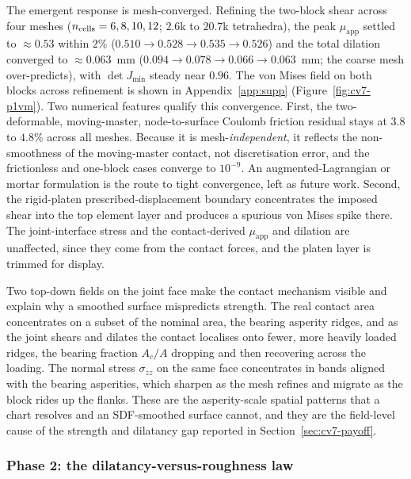 \documentclass{svjour3}                 %
\newcommand{\muapp}{\mu_{\mathrm{app}}}
\begin{document}
The emergent response is mesh-converged. Refining the two-block shear across four meshes ($n_{\rm cells}=6,8,10,12$; $2.6$k to $20.7$k tetrahedra), the peak $\muapp$ settled to $\approx0.53$ within $2\%$ ($0.510\to0.528\to0.535\to0.526$) and the total dilation converged to $\approx0.063$~mm ($0.094\to0.078\to0.066\to0.063$~mm; the coarse mesh over-predicts), with $\det J_{\min}$ steady near $0.96$. The von Mises field on both blocks across refinement is shown in Appendix~\ref{app:supp} (Figure~\ref{fig:cv7-p1vm}). Two numerical features qualify this convergence. First, the two-deformable, moving-master, node-to-surface Coulomb friction residual stays at $3.8$ to $4.8\%$ across all meshes. Because it is mesh-\emph{independent}, it reflects the non-smoothness of the moving-master contact, not discretisation error, and the frictionless and one-block cases converge to $10^{-9}$. An augmented-Lagrangian or mortar formulation \citep{alart1991mixed,simo1992augmented,puso2004mortar} is the route to tight convergence, left as future work. Second, the rigid-platen prescribed-displacement boundary concentrates the imposed shear into the top element layer and produces a spurious von Mises spike there. The joint-interface stress and the contact-derived $\muapp$ and dilation are unaffected, since they come from the contact forces, and the platen layer is trimmed for display.

Two top-down fields on the joint face make the contact mechanism visible and explain why a smoothed
surface mispredicts strength. The real contact area concentrates on a subset of the nominal area, the
bearing asperity ridges, and as the joint shears and dilates the contact localises onto fewer, more
heavily loaded ridges, the bearing fraction $A_c/A$ dropping and then recovering across the loading.
The normal stress $\sigma_{zz}$ on the same face concentrates in bands aligned with the bearing
asperities, which sharpen as the mesh refines and migrate as the block rides up the flanks. These are the
asperity-scale spatial patterns that a chart resolves and an SDF-smoothed surface cannot, and they are the
field-level cause of the strength and dilatancy gap reported in Section~\ref{sec:cv7-payoff}.

\subsubsection{Phase 2: the dilatancy-versus-roughness law}\label{sec:cv7-p2}
\end{document}
